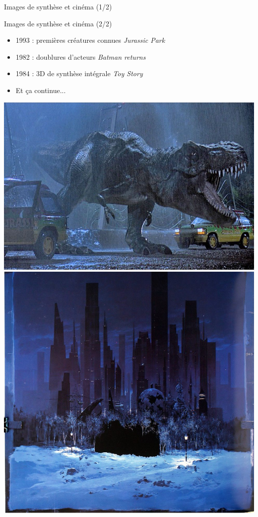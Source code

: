 \begin{frame}{Images de synthèse et cinéma (1/2)}
\begin{center}
\end{center}
\end{frame}

\begin{frame}{Images de synthèse et cinéma (2/2)}
\begin{itemize}
\item 1993 : premières créatures connues \textit{Jurassic Park}
\item 1982 : doublures d'acteurs \textit{Batman returns}
\item 1984 : 3D de synthèse intégrale \textit{Toy Story}
\item Et ça continue...
\end{itemize}
\begin{center}
\includegraphics[height=0.28\textheight]{figs/Jurassic-Park.jpg}
\hspace{0.1cm}
\includegraphics[height=0.28\textheight]{figs/BatmanReturns.jpg}

\end{center}
\end{frame}
